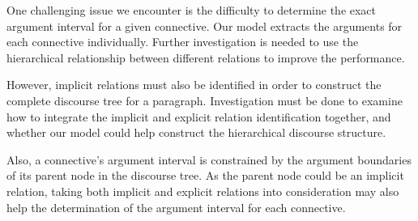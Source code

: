 One challenging issue we encounter is the difficulty to determine
the exact argument interval for a given connective. Our model extracts
the arguments for each connective individually. Further investigation
is needed to use the hierarchical relationship between different
relations to improve the performance.

However, implicit relations must also be identified in order
to construct the complete discourse tree for a paragraph.
Investigation must be done to examine how to integrate the implicit and
explicit relation identification together, and whether our model
could help construct the hierarchical discourse structure.

Also, a connective's argument interval is constrained by the
argument boundaries of its parent node in the discourse tree. As
the parent node could be an implicit relation, taking
both implicit and explicit relations into consideration may also help
the determination of the argument interval for each connective.
